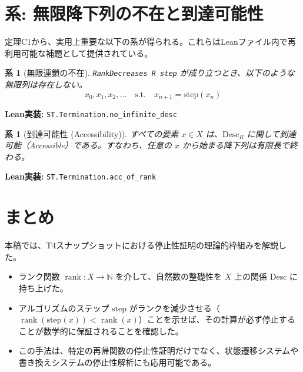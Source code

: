 \documentclass[a4paper,11pt]{article}
\theoremstyle{definition}
\theoremstyle{plain}
\newtheorem{corollary}[definition]{系}
\newcommand{\code}[1]{\texttt{#1}}
\newcommand{\rank}{\operatorname{rank}}
\newcommand{\Desc}{\mathrm{Desc}}
\newcommand{\step}{\mathrm{step}}
\newcommand{\N}{\mathbb{N}}
\begin{document}
\section{系: 無限降下列の不在と到達可能性}

定理C1から、実用上重要な以下の系が得られる。これらはLeanファイル内で再利用可能な補題として提供されている。

\begin{corollary}[無限連鎖の不在]
\code{RankDecreases R step} が成り立つとき、以下のような無限列は存在しない。
\[ x_0, x_1, x_2, \dots \quad \text{s.t.} \quad x_{n+1} = \step(x_n) \]
\end{corollary}
\noindent \textbf{Lean実装:} \code{ST.Termination.no\_infinite\_desc}

\begin{corollary}[到達可能性 (Accessibility)]
すべての要素 $x \in X$ は、$\Desc_R$ に関して到達可能（Accessible）である。すなわち、任意の $x$ から始まる降下列は有限長で終わる。
\end{corollary}
\noindent \textbf{Lean実装:} \code{ST.Termination.acc\_of\_rank}

\section{まとめ}
本稿では、T4スナップショットにおける停止性証明の理論的枠組みを解説した。
\begin{itemize}
    \item ランク関数 $\rank : X \to \N$ を介して、自然数の整礎性を $X$ 上の関係 $\Desc$ に持ち上げた。
    \item アルゴリズムのステップ $\step$ がランクを減少させる（$\rank(\step(x)) < \rank(x)$）ことを示せば、その計算が必ず停止することが数学的に保証されることを確認した。
    \item この手法は、特定の再帰関数の停止性証明だけでなく、状態遷移システムや書き換えシステムの停止性解析にも応用可能である。
\end{itemize}
\end{document}
